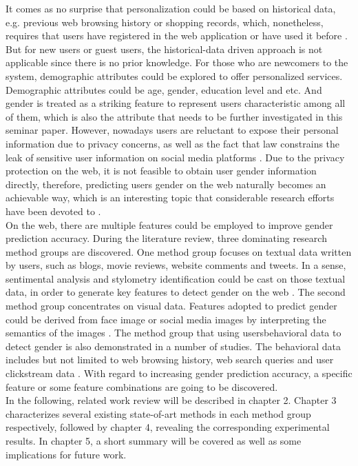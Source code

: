\documentclass[runningheads]{llncs}
\begin{document}
	It comes as no surprise that personalization could be based on historical data, e.g. previous web browsing history or shopping records, which, nonetheless, requires that users have registered in the web application or have used it before \cite{duong2016customer}. But for new users or guest users, the historical-data driven approach is not applicable since there is no prior knowledge. For those who are newcomers to the system, demographic attributes could be explored to offer personalized services. Demographic attributes could be age, gender, education level and etc. And gender is treated as a striking feature to represent user\textquotesingle s characteristic among all of them, which is also the attribute that needs to be further investigated in this seminar paper. However, nowadays users are reluctant to expose their personal information due to privacy concerns, as well as the fact that law constrains the leak of sensitive user information on social media platforms \cite{zheleva2009join}. Due to the privacy protection on the web, it is not feasible to obtain user gender information directly, therefore, predicting user\textquotesingle s gender on the web naturally becomes an achievable way, which is an interesting topic that considerable research efforts have been devoted to \cite{phuong2014gender}. \\
	
	On the web, there are multiple features could be employed to improve gender prediction accuracy. During the literature review, three dominating research method groups are discovered. One method group focuses on textual data written by users, such as blogs, movie reviews, website comments and tweets. In a sense, sentimental analysis and stylometry identification could be cast on those textual data, in order to generate key features to detect gender on the web \cite{phuong2014gender}. The second method group concentrates on visual data. Features adopted to predict gender could be derived from face image or social media images by interpreting the semantics of the images \cite{merler2015you}. The method group that using users\textquotesingle behavioral data to detect gender is also demonstrated in a number of studies. The behavioral data includes but not limited to web browsing history, web search queries and user clickstream data \cite{hu2007demographic}. With regard to increasing gender prediction accuracy, a specific feature or some feature combinations are going to be discovered. \\
	
	In the following, related work review will be described in chapter 2. Chapter 3 characterizes several existing state-of-art methods in each method group respectively, followed by chapter 4, revealing the corresponding experimental results. In chapter 5, a short summary will be covered as well as some implications for future work. 
	
\end{document}
